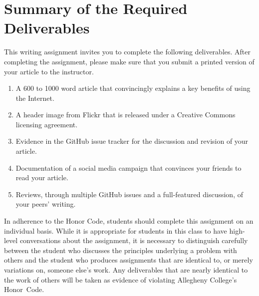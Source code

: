 \section*{Summary of the Required Deliverables}

This writing assignment invites you to complete the following deliverables. After completing the assignment, please make
sure that you submit a printed version of your article to the instructor.

\vspace*{-.1in}
\begin{enumerate}
  \setlength{\itemsep}{-.01in}

  \item A 600 to 1000 word article that convincingly explains a key benefits of using the Internet.
  \item A header image from Flickr that is released under a Creative Commons licensing agreement.
  \item Evidence in the GitHub issue tracker for the discussion and revision of your article.
  \item Documentation of a social media campaign that convinces your friends to read your article.
  \item Reviews, through multiple GitHub issues and a full-featured discussion, of your peers' writing.

\end{enumerate}
\vspace*{-.1in}

In adherence to the Honor Code, students should complete this assignment on an individual basis. While it is appropriate
for students in this class to have high-level conversations about the assignment, it is necessary to distinguish
carefully between the student who discusses the principles underlying a problem with others and the student who produces
assignments that are identical to, or merely variations on, someone else's work. Any deliverables that are nearly
identical to the work of others will be taken as evidence of violating Allegheny College's \mbox{Honor Code}.




